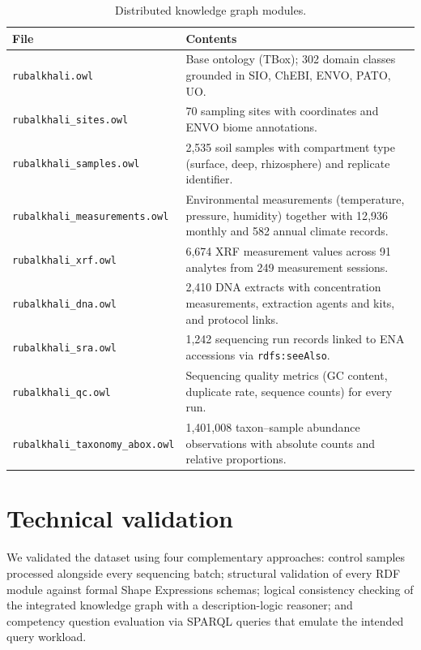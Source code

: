 \documentclass[11pt,a4paper]{article}
\begin{document}
\begin{table}[h]
  \centering
  \caption{Distributed knowledge graph modules.}
  \label{tab:modules}
  \small
  \begin{tabular}{lp{}}
    \toprule
    File & Contents \\
    \midrule
    \texttt{rubalkhali.owl} & Base ontology (TBox); 302 domain
      classes grounded in SIO, ChEBI, ENVO, PATO, UO. \\
    \texttt{rubalkhali\_sites.owl} & 70 sampling sites with
      coordinates and ENVO biome annotations. \\
    \texttt{rubalkhali\_samples.owl} & 2{,}535 soil samples with
      compartment type (surface, deep, rhizosphere) and replicate
      identifier. \\
    \texttt{rubalkhali\_measurements.owl} & Environmental measurements
      (temperature, pressure, humidity) together with 12{,}936 monthly
      and 582 annual climate records. \\
    \texttt{rubalkhali\_xrf.owl} & 6{,}674 XRF measurement values
      across 91 analytes from 249 measurement sessions. \\
    \texttt{rubalkhali\_dna.owl} & 2{,}410 DNA extracts with
      concentration measurements, extraction agents and kits, and
      protocol links. \\
    \texttt{rubalkhali\_sra.owl} & 1{,}242 sequencing run records
      linked to ENA accessions via \texttt{rdfs:seeAlso}. \\
    \texttt{rubalkhali\_qc.owl} & Sequencing quality metrics (GC
      content, duplicate rate, sequence counts) for every run. \\
    \texttt{rubalkhali\_taxonomy\_abox.owl} & 1{,}401{,}008
      taxon--sample abundance observations with absolute counts and
      relative proportions. \\
    \bottomrule
  \end{tabular}
\end{table}

\section{Technical validation}

We validated the dataset using four complementary approaches: control
samples processed alongside every sequencing batch; structural
validation of every RDF module against formal Shape Expressions
schemas; logical consistency checking of the integrated knowledge
graph with a description-logic reasoner; and competency question
evaluation via SPARQL queries that emulate the intended query workload.
\end{document}
